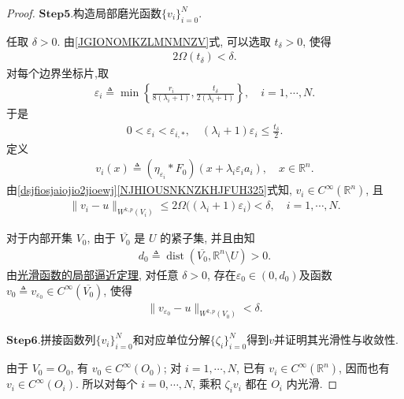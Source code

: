 \documentclass[../../main.tex]{subfiles}
\begin{document}
\begin{proof}
\noindent$\mathbf{Step}\bm{5}$.{\heiti 构造局部磨光函数$\{v_i\}_{i=0}^{N}$.}

任取 $\delta>0$. 由\eqref{JGIONOMKZLMNMNZV}式, 可以选取 $t_{\delta}>0$, 使得
\begin{align*}
2\Omega(t_{\delta})<\delta.
\end{align*}
对每个边界坐标片,取
\begin{align*}
\varepsilon_i
\triangleq
\min\left\{
\frac{r_i}{8(\lambda_i+1)},
\frac{t_{\delta}}{2(\lambda_i+1)}
\right\},
\quad i=1,\cdots,N.
\end{align*}
于是
\begin{align*}
0<\varepsilon_i<\varepsilon_{i,*},\quad
(\lambda_i+1)\varepsilon_i
\leqslant\frac{t_{\delta}}{2}.
\end{align*}
定义
\begin{align*}
v_i(x)
\triangleq
(\eta_{\varepsilon_i}*F_0)
(x+\lambda_i\varepsilon_i a_i),
\quad x\in\mathbb{R}^{n}.
\end{align*}
由\eqref{dsjfiosjaiojio2jioewj}\eqref{NJHIOUSNKNZKHJFUH325}式知,
$v_i\in C^{\infty}(\mathbb{R}^{n})$, 且
\begin{align}
\|v_i-u\|_{W^{k,p}(V_i)}
\leqslant
2\Omega\bigl((\lambda_i+1)\varepsilon_i\bigr)
<\delta,
\quad i=1,\cdots,N.
\label{align:ch05-边界局部误差}
\end{align}

对于内部开集 $V_0$, 由于 $\overline{V_0}$ 是 $U$ 的紧子集, 并且由知
\begin{align*}
d_0\triangleq
\operatorname{dist}(\overline{V_0},\mathbb{R}^{n}\setminus U)>0.
\end{align*}
由\hyperref[theorem:ch05-光滑函数的局部逼近定理]{光滑函数的局部逼近定理}, 对任意 $\delta>0$, 存在$\varepsilon_0\in (0,d_0)$及函数 $v_0\triangleq v_{\varepsilon_0}\in C^\infty(\overline{V_0})$, 使得
\begin{align}
\|v_{\varepsilon_0}-u\|_{W^{k,p}(V_0)}<\delta.
\label{align:ch05-内部逼近误差}
\end{align}

\noindent$\mathbf{Step}\mathbf{6}.${\heiti 拼接函数列$\{v_i\}_{i=0}^{N}$和对应单位分解$\{\zeta_i\}_{i=0}^{N}$得到$v$并证明其光滑性与收敛性.}

由于 $V_0=O_0$, 有 $v_0\in C^\infty(O_0)$; 对 $i=1,\cdots,N$, 已有 $v_i\in C^\infty(\mathbb{R}^{n})$, 因而也有 $v_i\in C^\infty(O_i)$. 所以对每个 $i=0,\cdots,N$, 乘积 $\zeta_i v_i$ 都在 $O_i$ 内光滑.


\end{proof}
\end{document}
